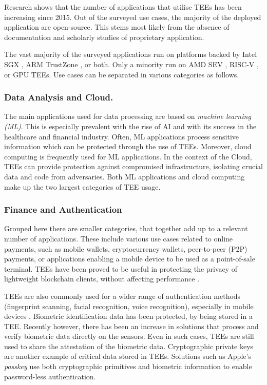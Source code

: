\documentclass[runningheads,a4paper]{uwsese}
\begin{document}
Research shows that the number of applications that utilise TEEs has been
increasing since 2015. Out of the surveyed use cases, the majority of the
deployed application are open-source. This stems most likely from the absence
of documentation and scholarly studies of proprietary application.

The vast majority of the surveyed applications run on platforms backed by Intel
SGX \cite{intel_sgx}, ARM TrustZone \cite{arm_tz}, or both. Only a minority run
on AMD SEV \cite{amd_sev}, RISC-V \cite{tee_keystone}, or GPU TEEs. Use cases
can be separated in various categories as follows.

\subsubsection{Data Analysis and Cloud.} 

The main applications used for data processing are based on \emph{machine
learning (ML)}. This is especially prevalent with the rise of AI and with its
success in the healthcare and financial industry. Often, ML applications
process sensitive information which can be protected through the use of TEEs.
Moreover, cloud computing is frequently used for ML applications. In the
context of the Cloud, TEEs can provide protection against compromised
infrastructure, isolating crucial data and code from adversaries. Both ML
applications and cloud computing make up the two largest categories of TEE
usage.

\subsubsection{Finance and Authentication}

Grouped here there are smaller categories, that together add up to a relevant
number of applications. These include various use cases related to online
payments, such as mobile wallets, cryptocurrency wallets, peer-to-peer (P2P)
payments, or applications enabling a mobile device to be used as a
point-of-sale terminal. TEEs have been proved to be useful in protecting the
privacy of lightweight blockchain clients, without affecting performance
\cite{light_blockchain}.

TEEs are also commonly used for a wider range of authentication methods
(fingerprint scanning, facial recognition, voice recognition), especially in
mobile devices \cite{tee_in_android}. Biometric identification data has been
protected, by being stored in a TEE. Recently however, there has been an
increase in solutions that process and verify biometric data directly on the
sensors. Even in such cases, TEEs are still used to share the attestation of
the biometric data. Cryptographic private keys are another example of critical
data stored in TEEs. Solutions such as Apple's \emph{passkey}
\cite{apple_passkey} use both cryptographic primitives and biometric
information to enable password-less authentication.
\end{document}
